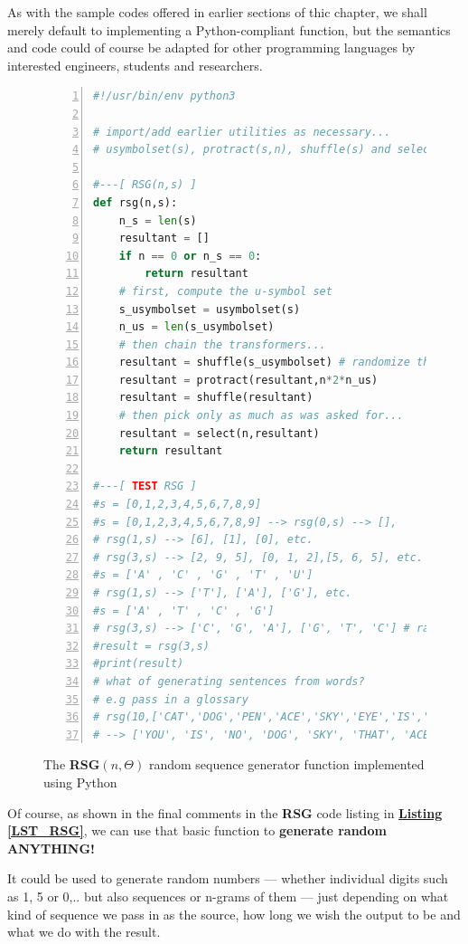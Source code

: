 \documentclass[a4paper, 18pt]{book} %
\begin{document}
As with the sample codes offered in earlier sections of thic chapter, we shall merely default to implementing a Python-compliant function, but the semantics and code could of course be adapted for other programming languages by interested engineers, students and researchers.

\begin{figure}[H]
  \begin{center}
  \begin{lstlisting}[caption={The RSG}, label={LST_RSG}, language=Python, frame=single, numbers=left, basicstyle=\ttfamily,  commentstyle=\color{blue}]
#!/usr/bin/env python3

# import/add earlier utilities as necessary...
# usymbolset(s), protract(s,n), shuffle(s) and select(n,s)

#---[ RSG(n,s) ]
def rsg(n,s):
    n_s = len(s)
    resultant = []
    if n == 0 or n_s == 0:
        return resultant
    # first, compute the u-symbol set
    s_usymbolset = usymbolset(s)
    n_us = len(s_usymbolset)
    # then chain the transformers...
    resultant = shuffle(s_usymbolset) # randomize the symbol set
    resultant = protract(resultant,n*2*n_us)
    resultant = shuffle(resultant)
    # then pick only as much as was asked for...
    resultant = select(n,resultant)
    return resultant

#---[ TEST RSG ]
#s = [0,1,2,3,4,5,6,7,8,9]
#s = [0,1,2,3,4,5,6,7,8,9] --> rsg(0,s) --> [],
# rsg(1,s) --> [6], [1], [0], etc.
# rsg(3,s) --> [2, 9, 5], [0, 1, 2],[5, 6, 5], etc.
#s = ['A' , 'C' , 'G' , 'T' , 'U']
# rsg(1,s) --> ['T'], ['A'], ['G'], etc.
#s = ['A' , 'T' , 'C' , 'G']
# rsg(3,s) --> ['C', 'G', 'A'], ['G', 'T', 'C'] # random DNA codons!
#result = rsg(3,s)
#print(result)
# what of generating sentences from words?
# e.g pass in a glossary
# rsg(10,['CAT','DOG','PEN','ACE','SKY','EYE','IS','THAT','NO','YOU']) 
# --> ['YOU', 'IS', 'NO', 'DOG', 'SKY', 'THAT', 'ACE', 'EYE', 'CAT', 'PEN']
\end{lstlisting}
  \end{center}
  \caption{The \textbf{RSG}$(n,\Theta)$ random sequence generator function implemented using Python}
\end{figure}

Of course, as shown in the final comments in the \textbf{RSG} code listing in \textbf{\hyperref[LST_RSG]{Listing \ref{LST_RSG}}}, we can use that basic function to \textbf{generate random ANYTHING!} 

It could be used to generate random numbers --- whether individual digits such as 1, 5 or 0,.. but also sequences or n-grams of them --- just depending on what kind of sequence we pass in as the source, how long we wish the output to be and what we do with the result. 
\end{document}
